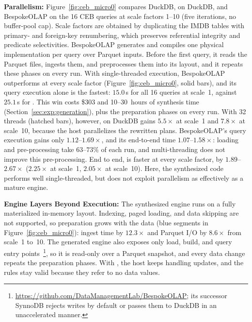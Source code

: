 \textbf{Parallelism:} Figure~\ref{fig:ceb_micro0} compares DuckDB, {\sys} on DuckDB, and BespokeOLAP on the 16 \textsf{CEB} queries at scale factors 1--10 (five iterations, no buffer-pool cap). Scale factors are obtained by duplicating the \textsf{IMDB} tables with primary- and foreign-key renumbering, which preserves referential integrity and predicate selectivities. BespokeOLAP generates and compiles one physical implementation per query over Parquet inputs. Before the first query, it reads the Parquet files, ingests them, and preprocesses them into its layout, and it repeats these phases on every run.
With single-threaded execution, BespokeOLAP outperforms {\sys} at every scale factor (Figure~\ref{fig:ceb_micro0}, solid bars), and its query execution alone is the fastest: $15.0$\,s for all 16 queries at scale~1, against $25.1$\,s for {\sys}. This win costs \$303 and 10--30~hours of synthesis time (Section~\ref{sec:exp:generation}), plus the preparation phases on every run. With 32 threads (hatched bars), however, {\sys} on DuckDB gains $5.5\times$ at scale~1 and $7.8\times$ at scale~10, because the host parallelizes the rewritten plans. BespokeOLAP's query execution gains only $1.12$--$1.69\times$, and its end-to-end time $1.07$--$1.58\times$: loading and pre-processing take $63$--$73\%$ of each run, and multi-threading does not improve this pre-processing. End to end, {\sys} is faster at every scale factor, by $1.89$--$2.67\times$ ($2.25\times$ at scale~1, $2.05\times$ at scale~10).  Here, the synthesized code performs well single-threaded, but does not exploit parallelism as effectively as a mature engine.

\textbf{Engine Layers Beyond Execution:} The synthesized engine runs on a fully materialized in-memory layout. Indexing, paged loading, and data skipping are not supported, so preparation grows with the data (blue segments in Figure~\ref{fig:ceb_micro0}): ingest time by $12.3\times$ and Parquet I/O by $8.6\times$ from scale~1 to~10. The generated engine also exposes only load, build, and query entry points~\cite{bespokeolap}\footnote{\url{https://github.com/DataManagementLab/BespokeOLAP}; its successor SynnoDB rejects writes by default or passes them to DuckDB in an unaccelerated manner.}, so it is read-only over a Parquet snapshot, and every data change repeats the preparation phases. With {\sys}, the host keeps handling updates, and the rules stay valid because they refer to no data values.\shorten 

